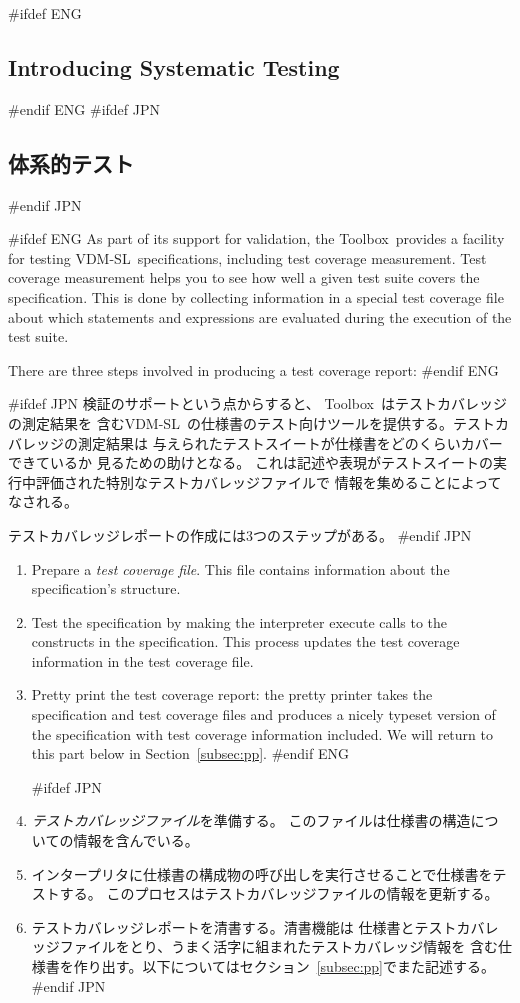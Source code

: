 \documentclass[\pformat,12pt]{article}
\newcommand{\vdmslpp}{VDM-SL}
\newcommand{\Toolbox}{Toolbox}
\newcommand{\vdmslpp}{VDM++}
\newcommand{\Toolbox}{Toolbox}
\begin{document}
#ifdef ENG
\subsection{Introducing Systematic Testing}
#endif ENG
#ifdef JPN
\subsection{体系的テスト}
#endif JPN
\label{tour:testing}

#ifdef ENG
As part of its support for validation, the \Toolbox\ provides a
facility for testing \vdmslpp\ specifications, including test
  coverage measurement.  Test coverage measurement helps you to see
how well a given test suite covers the
specification. This is done by collecting information in a special
test coverage file about which statements and expressions are
evaluated during the execution of the test suite.

There are three steps involved in producing a test coverage report:
#endif ENG

#ifdef JPN
検証のサポートという点からすると、 \Toolbox\ はテストカバレッジの測定結果を
含む\vdmslpp\ の仕様書のテスト向けツールを提供する。テストカバレッジの測定結果は
与えられたテストスイートが仕様書をどのくらいカバーできているか
見るための助けとなる。
これは記述や表現がテストスイートの実行中評価された特別なテストカバレッジファイルで
情報を集めることによってなされる。

テストカバレッジレポートの作成には3つのステップがある。
#endif JPN

\begin{enumerate}
#ifdef ENG
\item
Prepare a {\em test coverage file}. This file contains
  information about the specification's structure. 
\item Test the specification by making the interpreter execute calls
to the constructs in the specification. This process updates the test
coverage information in the test coverage file.
\item Pretty print the test coverage report: the pretty printer takes
  the specification and test coverage files and produces a nicely typeset
  version of the specification with test coverage information
  included. We will return to this part below in Section~\ref{subsec:pp}.
#endif ENG

#ifdef JPN
\item
{\em テストカバレッジファイル}を準備する。
このファイルは仕様書の構造についての情報を含んでいる。

\item
インタープリタに仕様書の構成物の呼び出しを実行させることで仕様書をテストする。
このプロセスはテストカバレッジファイルの情報を更新する。

\item
テストカバレッジレポートを清書する。清書機能は
仕様書とテストカバレッジファイルをとり、うまく活字に組まれたテストカバレッジ情報を
含む仕様書を作り出す。以下についてはセクション~\ref{subsec:pp}でまた記述する。
#endif JPN
\end{enumerate}
\end{document}
